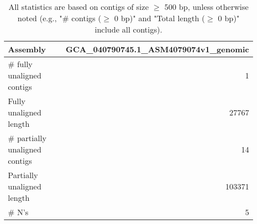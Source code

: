 \documentclass[12pt,a4paper]{article}
\begin{document}
\begin{table}[ht]
\begin{center}
\caption{All statistics are based on contigs of size $\geq$ 500 bp, unless otherwise noted (e.g., "\# contigs ($\geq$ 0 bp)" and "Total length ($\geq$ 0 bp)" include all contigs).}
\begin{tabular}{|l*{1}{|r}|}
\hline
Assembly & GCA\_040790745.1\_ASM4079074v1\_genomic \\ \hline
\# fully unaligned contigs & 1 \\ \hline
Fully unaligned length & 27767 \\ \hline
\# partially unaligned contigs & 14 \\ \hline
Partially unaligned length & 103371 \\ \hline
\# N's & 5 \\ \hline
\end{tabular}
\end{center}
\end{table}
\end{document}
